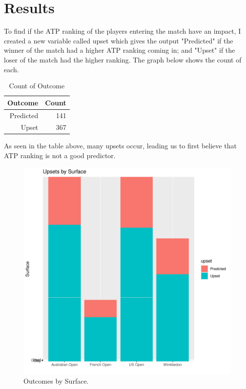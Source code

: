 \documentclass[12pt]{article}
\begin{document}
\section{Results}
\label{sec:results}

To find if the ATP ranking of the players entering the match have an impact, I created a new 
variable called upset which gives the output "Predicted" if the winner of the match had a higher 
ATP ranking coming in; and "Upset" if the loser of the match had the higher ranking. The graph 
below shows the count of each.

\begin{table}[ht]
  \caption{Count of Outcome}
  \label{tab:upset}
\centering
\begin{tabular}{rr}
  \hline
Outcome & Count \\
  \hline
Predicted & 141 \\
Upset & 367 \\
  \hline
\end{tabular}
\end{table}


As seen in the table above, many upsets occur, leading us to first believe that ATP ranking is not 
a good predictor.


\begin{figure} 
  \centering
  \includegraphics[width=\textwidth]{surfaceoutcome.pdf}
  \caption{Outcomes by Surface.}
 \label{fig:upsets}
\end{figure}
\end{document}
